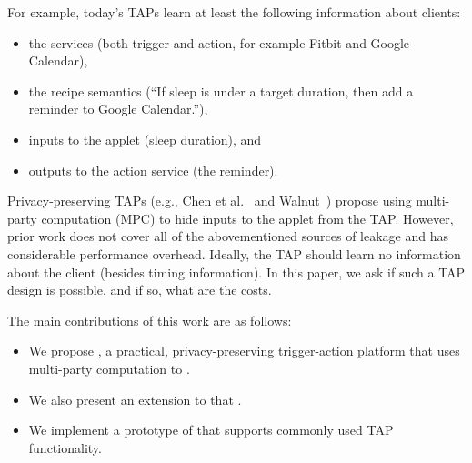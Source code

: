 For example, today's TAPs learn at least the following information about clients:
\begin{itemize}[leftmargin=*]
  \item the services (both trigger and action, for example Fitbit and Google Calendar),
  \item the recipe semantics (``If sleep is under a target duration, then add a
    reminder to Google Calendar.''),
  \item inputs to the applet (sleep duration), and
  \item outputs to the action service (the reminder).
\end{itemize}

Privacy-preserving TAPs (e.g., Chen et al.~\cite{DBLP:conf/sp/ChenCWSCF21} and
Walnut~\cite{DBLP:journals/corr/abs-2009-12447}) propose using multi-party
computation (MPC) to hide inputs to the applet from the TAP. However, prior work
does not cover all of the abovementioned sources of leakage and has considerable
performance overhead. Ideally, the TAP should learn no information about the
client (besides timing information). In this paper, we ask if such a TAP design
is possible, and if so, what are the costs.

The main contributions of this work are as follows:
\begin{itemize}[leftmargin=*]
  \item We propose \sys, a practical, privacy-preserving trigger-action platform
    that uses multi-party computation to .
  \item We also present an extension to \sys that .
  \item We implement a prototype of \sys that supports commonly used TAP
    functionality.
\end{itemize}
